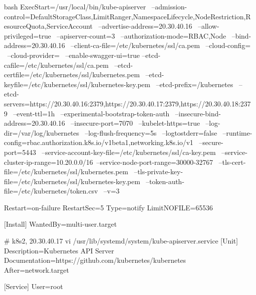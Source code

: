 \begin{outline}[enumerate]
\begin{code-in-enumerate}{bash}
ExecStart=/usr/local/bin/kube-apiserver \
    --admission-control=DefaultStorageClass,LimitRanger,NamespaceLifecycle,NodeRestriction,ResourceQuota,ServiceAccount \
    --advertise-address=20.30.40.16 \
    --allow-privileged=true \
    --apiserver-count=3 \
    --authorization-mode=RBAC,Node \
    --bind-address=20.30.40.16 \
    --client-ca-file=/etc/kubernetes/ssl/ca.pem \
    --cloud-config= \
    --cloud-provider= \
    --enable-swagger-ui=true --etcd-cafile=/etc/kubernetes/ssl/ca.pem \
    --etcd-certfile=/etc/kubernetes/ssl/kubernetes.pem \
    --etcd-keyfile=/etc/kubernetes/ssl/kubernetes-key.pem \
    --etcd-prefix=/kubernetes \
    --etcd-servers=https://20.30.40.16:2379,https://20.30.40.17:2379,https://20.30.40.18:2379 \
    --event-ttl=1h \
    --experimental-bootstrap-token-auth \
    --insecure-bind-address=20.30.40.16 \
    --insecure-port=7070 \
    --kubelet-https=true \
    --log-dir=/var/log/kubernetes \
    --log-flush-frequency=5s \
    --logtostderr=false \
    --runtime-config=rbac.authorization.k8s.io/v1beta1,networking.k8s.io/v1 \
    --secure-port=5443 \
    --service-account-key-file=/etc/kubernetes/ssl/ca-key.pem \
    --service-cluster-ip-range=10.20.0.0/16\
    --service-node-port-range=30000-32767 \
    --tls-cert-file=/etc/kubernetes/ssl/kubernetes.pem \
    --tls-private-key-file=/etc/kubernetes/ssl/kubernetes-key.pem \
    --token-auth-file=/etc/kubernetes/token.csv \
    --v=3

Restart=on-failure
RestartSec=5
Type=notify
LimitNOFILE=65536

[Install]
WantedBy=multi-user.target

# k8s2, 20.30.40.17
vi /usr/lib/systemd/system/kube-apiserver.service
[Unit]
Description=Kubernetes API Server
Documentation=https://github.com/kubernetes/kubernetes
After=network.target

[Service]
User=root


\end{code-in-enumerate}
\end{outline}
